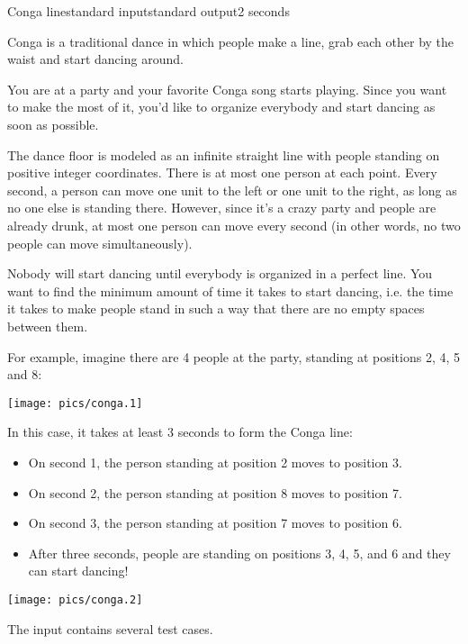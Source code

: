 \begin{problem}{Conga line}{standard input}{standard output}{2 seconds}

Conga is a traditional dance in which people make a line, grab each other by the waist and start dancing around.

You are at a party and your favorite Conga song starts playing. Since you want to make the most of it, you'd like to organize everybody and start dancing as soon as possible.

The dance floor is modeled as an infinite straight line with people standing on positive integer coordinates. There is at most one person at each point.
Every second, a person can move one unit to the left or one unit to the right, as long as no one else is standing there. However, since
it's a crazy party and people are already drunk, at most one person can move every second (in other words, no two people can move simultaneously).

Nobody will start dancing until everybody is organized in a perfect line. You want to find the minimum amount of time it takes to start dancing, i.e. the time it takes to make people stand in such a way that there are no empty spaces between them.

For example, imagine there are 4 people at the party, standing at positions 2, 4, 5 and 8:

\begin{center}
\texttt{[image: pics/conga.1]}
\end{center}


In this case, it takes at least 3 seconds to form the Conga line:
\begin{itemize}
  \item On second 1, the person standing at position 2 moves to position 3.
  \item On second 2, the person standing at position 8 moves to position 7.
  \item On second 3, the person standing at position 7 moves to position 6.
  \item After three seconds, people are standing on positions 3, 4, 5, and 6 and they can start dancing!
\end{itemize}

\begin{center}
\texttt{[image: pics/conga.2]}
\end{center}


\InputFile

The input contains several test cases.


\end{problem}
